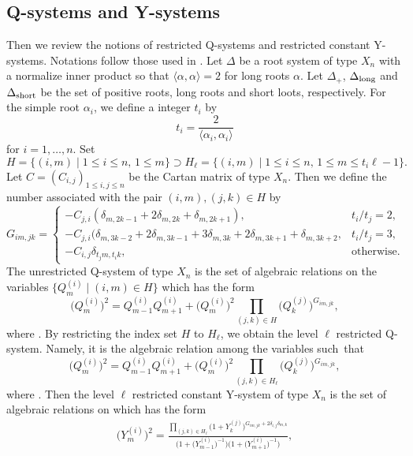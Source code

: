 \documentclass[10pt,a4paper]{amsart}
\numberwithin{equation}{section}
\newcommand{\pair}[1]{\langle{#1}\rangle}
\begin{document}
	\subsection{Q-systems and Y-systems}
Then we review the notions of restricted Q-systems and restricted constant Y-systems.
Notations follow those used in \cite{KNS}.
Let $\Delta$ be a root system of type $X_n$ with a normalize inner product so that $\pair{\alpha,\alpha}=2$ for long roots $\alpha$.
Let $\Delta_+$, $\Delta_{{\rm long}}$ and $\Delta_{{\rm short}}$ be the set of positive roots, long roots and short loots, respectively.
For the simple root $\alpha_i$, we define a integer $t_i$ by
		\[t_i=\frac{2}{\pair{\alpha_i,\alpha_i}}\]
for $i=1,\dots,n$.
Set
	\[H=\{(i,m)\mid 1\leq i\leq n,\, 1\leq m\}\supset H_\ell=\{(i,m)\mid1\leq i\leq n,\, 1\leq m\leq t_i\ell-1\}.\]
Let $C=(C_{i,j})_{1\leq i,j\leq n}$ be the Cartan matrix of type $X_n$.
Then we define the number associated with the pair $(i,m),(j,k)\in H$ by
	\[G_{im,jk}=
		\begin{cases}
		-C_{j,i}(\delta_{m,2k-1}+2\delta_{m,2k}+\delta_{m,2k+1}),& t_i/t_j=2,\\
		-C_{j,i}(\delta_{m,3k-2}+2\delta_{m,3k-1}+3\delta_{m,3k}+2\delta_{m,3k+1}+\delta_{m,3k+2},& t_i/t_j=3,\\
		-C_{i,j}\delta_{t_jm,t_ik},& \text{otherwise}.
		\end{cases}\]
The unrestricted Q-system of type $X_n$ is the set of algebraic relations on the variables $\bigl\{Q_m^{(i)}\mid(i,m)\in H\bigr\}$ which has the form
	\[\bigl(Q_m^{(i)}\bigr)^2=Q_{m-1}^{(i)}Q_{m+1}^{(i)}+\bigl(Q_m^{(i)}\bigr)^2\prod_{(j,k)\in H}\bigl(Q_k^{(j)}\bigr)^{G_{im,jk}},\]
where .
By restricting the index set $H$ to $H_\ell$, we obtain the level $\ell$ restricted Q-system.
Namely, it is the algebraic relation among the variables  such~that
	\[\bigl(Q_m^{(i)}\bigr)^2=Q_{m-1}^{(i)}Q_{m+1}^{(i)}+\bigl(Q_m^{(i)}\bigr)^2\prod_{(j,k)\in H_\ell}\bigl(Q_k^{(j)}\bigr)^{G_{im,jk}},\]
where .
Then the level $\ell$ restricted constant Y-system of type $X_n$ is the set of algebraic relations on  which has the form
	\begin{align}\label{Y-sys}
	\bigl(Y_m^{(i)}\bigr)^2=\frac{\prod_{(j,k)\in H_\ell}\bigl(1+Y_k^{(j)}\bigr)^{G_{im,jk}+2\delta_{i,j}\delta_{m,k}}}{\bigl(1+\bigl(Y_{m-1}^{(i)}\bigr)^{-1}\bigr)\bigl(1+\bigl(Y_{m+1}^{(i)}\bigr)^{-1}\bigr)},
	\end{align}
\end{document}
